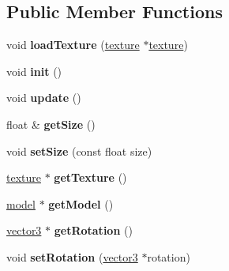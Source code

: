 \subsection*{Public Member Functions}
\begin{DoxyCompactItemize}
\item 
\mbox{\label{classflounder_1_1skybox_a56b2c4d80af17be74f249e9af1909751}} 
void {\bfseries load\+Texture} (\hyperlink{classflounder_1_1texture}{texture} $\ast$\hyperlink{classflounder_1_1texture}{texture})
\item 
\mbox{\label{classflounder_1_1skybox_a8492f806112e0f0b42c990bc7d3cbd21}} 
void {\bfseries init} ()
\item 
\mbox{\label{classflounder_1_1skybox_a0b368ba1d40f9dc7008875e720f28dc6}} 
void {\bfseries update} ()
\item 
\mbox{\label{classflounder_1_1skybox_a0d78d655d39bec325636c5672d744f5f}} 
float \& {\bfseries get\+Size} ()
\item 
\mbox{\label{classflounder_1_1skybox_ad9483d0e97e54f5497c60b7350f9d888}} 
void {\bfseries set\+Size} (const float size)
\item 
\mbox{\label{classflounder_1_1skybox_a20c6e39b06419ed1e8614f70044aff04}} 
\hyperlink{classflounder_1_1texture}{texture} $\ast$ {\bfseries get\+Texture} ()
\item 
\mbox{\label{classflounder_1_1skybox_a451efb79710eec0ce2f14bec9cc85111}} 
\hyperlink{classflounder_1_1model}{model} $\ast$ {\bfseries get\+Model} ()
\item 
\mbox{\label{classflounder_1_1skybox_a887c324dbc5174dd38d8be6e2fb9ed04}} 
\hyperlink{classflounder_1_1vector3}{vector3} $\ast$ {\bfseries get\+Rotation} ()
\item 
\mbox{\label{classflounder_1_1skybox_ace1bd7310c363d6bcbdb14b814bd5447}} 
void {\bfseries set\+Rotation} (\hyperlink{classflounder_1_1vector3}{vector3} $\ast$rotation)
\item 

\end{DoxyCompactItemize}
